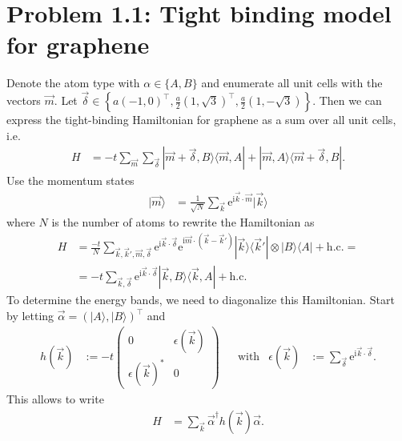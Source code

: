 \documentclass[english, parskip=full]{scrartcl}
\title{\titel}
\author{\autor}
\date{\today}
\newcommand{\oper}{}
\newcommand{\tecxt}{}
\newcommand{\Ket}{}
\renewcommand{\i}{\text{i}}
\newcommand{\e}{\text{e}}
\begin{document}
\maketitle  %

\section*{Problem 1.1: Tight binding model for graphene}
Denote the atom type with $\alpha\in\{A,B\}$ and enumerate all unit cells with the vectors $\vec{m}$.
Let $\vec{\delta}\in\left\{ a(-1,0)^\top, \frac{a}{2}(1,\sqrt{3})^\top, \frac{a}{2}(1,-\sqrt{3}) \right\}$.
Then we can express the tight-binding Hamiltonian for graphene as a sum over all unit cells, i.e.
\begin{align}
H&=-t\sum_{\vec{m}}\sum_{\vec{\delta}}\oper | \vec{m}+\vec{\delta},B \rangle\langle \vec{m},A |+\oper | \vec{m},A \rangle\langle \vec{m}+\vec{\delta},B |.
\end{align}
Use the momentum states
\begin{align}
\Ket | \vec{m} \rangle&=\frac{1}{\sqrt{N}}\sum_{\vec{k}}\e^{\i\vec{k}\cdot\vec{m}}\Ket | \vec{k} \rangle
\end{align}
where $N$ is the number of atoms to rewrite the Hamiltonian as
\begin{align}
H&=\frac{-t}{N}\sum_{\vec{k},\vec{k}',\vec{m},\vec{\delta}}\e^{\i\vec{k}\cdot\vec{\delta}}\e^{\i\vec{m}\cdot(\vec{k}-\vec{k}')}\oper | \vec{k} \rangle\langle \vec{k}' |\otimes\oper | B \rangle\langle A |+\tecxt\text{h.c.}=\\
&=-t\sum_{\vec{k},\vec{\delta}}\e^{\i\vec{k}\cdot\vec{\delta}}\oper | \vec{k},B \rangle\langle \vec{k},A |+\tecxt\text{h.c.}
\end{align}
To determine the energy bands, we need to diagonalize this Hamiltonian.
Start by letting $\vec{\alpha}=(\Ket | A \rangle,\Ket | B \rangle)^\top$ and
\begin{align}
h(\vec{k})&:=-t\begin{pmatrix}
0&\epsilon(\vec{k}) \\ \epsilon(\vec{k})^\ast & 0
\end{pmatrix}&&\tecxt\text{with}& \epsilon(\vec{k})&:=\sum_{\vec{\delta}}\e^{\i\vec{k}\cdot\vec{\delta}}.
\end{align}
This allows to write
\begin{align}
H&=\sum_{\vec{k}}\vec{\alpha}^\dagger h(\vec{k})\vec{\alpha}.
\end{align}
\end{document}
